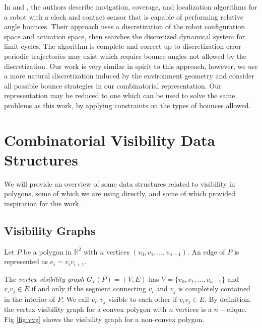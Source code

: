 \documentclass[]{article}  %
\begin{document}
In \cite{alam2017minimalist} and \cite{alam2018space}, the authors describe
navigation, coverage, and localization algorithms for a robot with a clock and
contact sensor that is capable of performing relative angle bounces. Their
approach uses a discretization of the robot configuration space and actuation
space, then searches the discretized dynamical system for limit cycles. The
algorithm is complete and correct up to discretization error - periodic
trajectories may exist which require bounce angles not allowed by the
discretization. Our work is very similar in spirit to this approach, however, we
use a more natural discretization induced by the environment geometry and
consider all possible bounce strategies in our combinatorial representation. Our
representation may be reduced to one which can be used to solve the same
problems as this work, by applying constraints on the types of bounces allowed.


\section{Combinatorial Visibility Data Structures}

We will provide an overview of some data structures related to visibility in
polygons, some of which we are using directly, and some of which provided
inspiration for this work.

\subsection{Visibility Graphs}


Let $P$ be a polygon in $\mathbb{R}^2$ with $n$ vertices
$(v_0, v_1, \ldots, v_{n-1})$. An edge of $P$ is represented as
$e_i = v_iv_{i+1}$.

The \textit{vertex visibility graph} $G_V(P) = (V, E)$ has $V = \{v_0, v_1, \ldots, v_{n-1}\}$ and $v_iv_j\in E$ if and only if the segment connecting $v_i$ and $v_j$ is completely contained in the interior of $P$. We call $v_i, v_j$ visible to each other if $v_iv_j\in E$. By definition, the vertex visibility graph for a convex polygon with $n$ vertices is a $n-$clique. Fig
\ref{fig:vvg} shows the visibility graph for a non-convex polygon.
\end{document}
